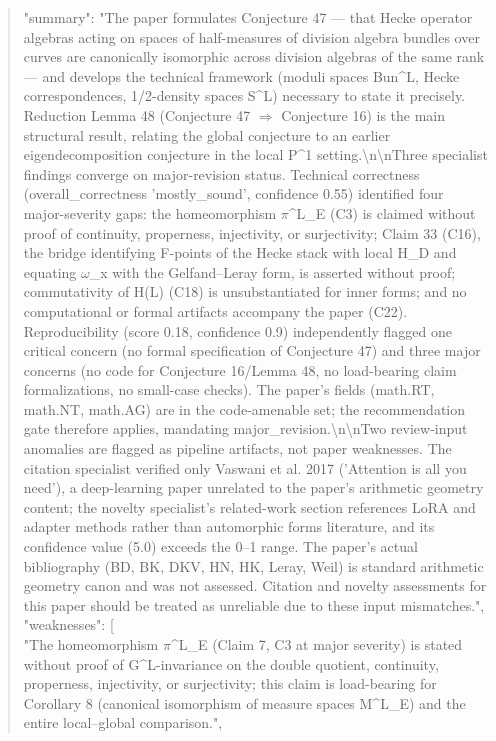 \documentclass[11pt]{article}
\begin{document}
\begin{quote}
  "summary": "The paper formulates Conjecture 47 --- that Hecke operator algebras acting on spaces of half-measures of division algebra bundles over curves are canonically isomorphic across division algebras of the same rank --- and develops the technical framework (moduli spaces Bun\^{}L, Hecke correspondences, 1/2-density spaces S\^{}L) necessary to state it precisely. Reduction Lemma 48 (Conjecture 47 \ensuremath{\Rightarrow} Conjecture 16) is the main structural result, relating the global conjecture to an earlier eigendecomposition conjecture in the local P\^{}1 setting.\textbackslash{}n\textbackslash{}nThree specialist findings converge on major-revision status. Technical correctness (overall\_correctness 'mostly\_sound', confidence 0.55) identified four major-severity gaps: the homeomorphism \ensuremath{\pi}\^{}L\_E (C3) is claimed without proof of continuity, properness, injectivity, or surjectivity; Claim 33 (C16), the bridge identifying F-points of the Hecke stack with local H\_D and equating \ensuremath{\omega}\_x with the Gelfand--Leray form, is asserted without proof; commutativity of H(L) (C18) is unsubstantiated for inner forms; and no computational or formal artifacts accompany the paper (C22). Reproducibility (score 0.18, confidence 0.9) independently flagged one critical concern (no formal specification of Conjecture 47) and three major concerns (no code for Conjecture 16/Lemma 48, no load-bearing claim formalizations, no small-case checks). The paper's fields (math.RT, math.NT, math.AG) are in the code-amenable set; the recommendation gate therefore applies, mandating major\_revision.\textbackslash{}n\textbackslash{}nTwo review-input anomalies are flagged as pipeline artifacts, not paper weaknesses. The citation specialist verified only Vaswani et al. 2017 ('Attention is all you need'), a deep-learning paper unrelated to the paper's arithmetic geometry content; the novelty specialist's related-work section references LoRA and adapter methods rather than automorphic forms literature, and its confidence value (5.0) exceeds the 0--1 range. The paper's actual bibliography (BD, BK, DKV, HN, HK, Leray, Weil) is standard arithmetic geometry canon and was not assessed. Citation and novelty assessments for this paper should be treated as unreliable due to these input mismatches.",\\
  "weaknesses": [\\
    "The homeomorphism \ensuremath{\pi}\^{}L\_E (Claim 7, C3 at major severity) is stated without proof of G\^{}L-invariance on the double quotient, continuity, properness, injectivity, or surjectivity; this claim is load-bearing for Corollary 8 (canonical isomorphism of measure spaces M\^{}L\_E) and the entire local--global comparison.",\\

\end{quote}
\end{document}
